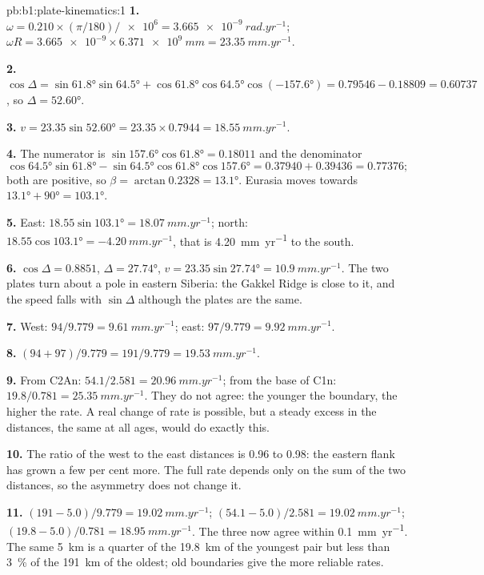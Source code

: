\begin{solution}{pb:b1:plate-kinematics:1}
\textbf{1.} $\omega = 0.210\times(\pi/180)/\num{e6} = \qty{3.665e-9}{rad.yr^{-1}}$;
$\omega R = \num{3.665e-9}\times\qty{6.371e9}{mm} = \qty{23.35}{mm.yr^{-1}}$.

\textbf{2.} $\cos\Delta = \sin\ang{61.8}\sin\ang{64.5} + \cos\ang{61.8}
\cos\ang{64.5}\cos(\ang{-157.6}) = 0.79546 - 0.18809 = 0.60737$, so
$\Delta = \ang{52.60}$.

\textbf{3.} $v = 23.35\sin\ang{52.60} = 23.35\times0.7944 =
\qty{18.55}{mm.yr^{-1}}$.

\textbf{4.} The numerator is $\sin\ang{157.6}\cos\ang{61.8} = 0.18011$ and the
denominator
\[
  \cos\ang{64.5}\sin\ang{61.8} - \sin\ang{64.5}\cos\ang{61.8}\cos\ang{157.6} =
  0.37940 + 0.39436 = 0.77376;
\]
both are positive, so $\beta = \arctan 0.2328 =
\ang{13.1}$. Eurasia moves towards $\ang{13.1} + \ang{90} = \ang{103.1}$.

\textbf{5.} East: $18.55\sin\ang{103.1} = \qty{18.07}{mm.yr^{-1}}$; north:
$18.55\cos\ang{103.1} = \qty{-4.20}{mm.yr^{-1}}$, that is \qty{4.20}{mm.yr^{-1}}
to the south.

\textbf{6.} $\cos\Delta = 0.8851$, $\Delta = \ang{27.74}$, $v = 23.35
\sin\ang{27.74} = \qty{10.9}{mm.yr^{-1}}$. The two plates turn about a pole in
eastern Siberia: the Gakkel Ridge is close to it, and the speed falls with
$\sin\Delta$ although the plates are the same.

\textbf{7.} West: $94/9.779 = \qty{9.61}{mm.yr^{-1}}$; east: $97/9.779 =
\qty{9.92}{mm.yr^{-1}}$.

\textbf{8.} $(94 + 97)/9.779 = 191/9.779 = \qty{19.53}{mm.yr^{-1}}$.

\textbf{9.} From C2An: $54.1/2.581 = \qty{20.96}{mm.yr^{-1}}$; from the base of
C1n: $19.8/0.781 = \qty{25.35}{mm.yr^{-1}}$. They do not agree: the younger the
boundary, the higher the rate. A real change of rate is possible, but a steady
excess in the distances, the same at all ages, would do exactly this.

\textbf{10.} The ratio of the west to the east distances is 0.96 to 0.98: the
eastern flank has grown a few per cent more. The full rate depends only on the
sum of the two distances, so the asymmetry does not change it.

\textbf{11.} $(191 - 5.0)/9.779 = \qty{19.02}{mm.yr^{-1}}$;
$(54.1 - 5.0)/2.581 = \qty{19.02}{mm.yr^{-1}}$; $(19.8 - 5.0)/0.781 =
\qty{18.95}{mm.yr^{-1}}$. The three now agree within
\qty{0.1}{mm.yr^{-1}}. The same \qty{5}{km} is a quarter of the \qty{19.8}{km}
of the youngest pair but less than \qty{3}{\percent} of the \qty{191}{km} of the
oldest; old boundaries give the more reliable rates.


\end{solution}
